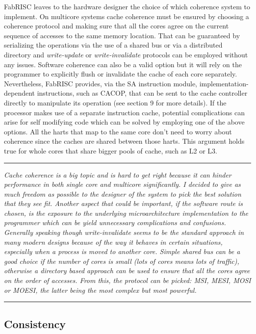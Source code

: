         FabRISC leaves to the hardware designer the choice of which coherence system to implement. On multicore systems cache coherence must be ensured by choosing a coherence protocol and making sure that all the cores agree on the current sequence of accesses to the same memory location. That can be guaranteed by serializing the operations via the use of a shared bus or via a distributed directory and \textit{write-update} or \textit{write-invalidate} protocols can be employed without any issues. Software coherence can also be a valid option but it will rely on the programmer to explicitly flush or invalidate the cache of each core separately. Nevertheless, FabRISC provides, via the SA instruction module, implementation-dependent instructions, such as CACOP, that can be sent to the cache controller directly to manipulate its operation (see section 9 for more details). If the processor makes use of a separate instruction cache, potential complications can arise for self modifying code which can be solved by employing one of the above options. All the harts that map to the same core don't need to worry about coherence since the caches are shared between those harts. This argument holds true for whole cores that share bigger pools of cache, such as L2 or L3.

    \par\noindent\rule{\textwidth}{0.4pt}
    \textit{Cache coherence is a big topic and is hard to get right because it can hinder performance in both single core and multicore significantly. I decided to give as much freedom as possible to the designer of the system to pick the best solution that they see fit. Another aspect that could be important, if the software route is chosen, is the exposure to the underlying microarchitecture implementation to the programmer which can be yield unnecessary complications and confusions. Generally speaking though write-invalidate seems to be the standard approach in many modern designs because of the way it behaves in certain situations, especially when a process is moved to another core. Simple shared bus can be a good choice if the number of cores is small (lots of cores means lots of traffic), otherwise a directory based approach can be used to ensure that all the cores agree on the order of accesses. From this, the protocol can be picked: MSI, MESI, MOSI or MOESI, the latter being the most complex but most powerful.}
    \par\noindent\rule{\textwidth}{0.4pt}

    \subsection{Consistency}

